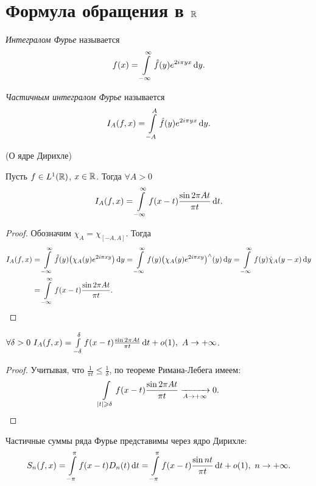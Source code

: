\section{Формула обращения в $\mathbb{R}$}

\begin{definition}
    \textit{Интегралом Фурье} называется
    \[
        f(x) = \int\limits_{-\infty}^\infty{\hat{f}(y) e^{2i\pi yx} \,\mathrm{d}y}
    .\]
\end{definition}

\begin{definition}
    \textit{Частичным интегралом Фурье} называется
    \[
        I_A(f, x) = \int\limits_{-A}^A{\hat{f}(y) e^{2i\pi yx} \,\mathrm{d} y}
    .\]
\end{definition}

\begin{lemma}(О ядре Дирихле)
   
    Пусть $f \in L^1(\mathbb{R})$, $x \in \mathbb{R}$. Тогда $\forall A > 0$
    \[
        I_A(f, x) = \int\limits_{-\infty}^\infty{f(x - t) \frac{\sin{2\pi At}}{\pi t} \,\mathrm{d}t} 
    .\]
\end{lemma}
\begin{proof}
    Обозначим $\chi_A = \chi_{[-A, A]}$. Тогда
    \begin{align*}
        I_A(f, x) 
        &= \intl_{-\infty}^\infty{\hat{f}(y) \parens*{\chi_A(y) e^{2i\pi xy}} \dd y}
        = \intl_{-\infty}^\infty{f(y) \parens*{\chi_A(y) e^{2i\pi xy}}^\wedge(y) \dd y}
        = \intl_{-\infty}^\infty{f(y) \hat{\chi}_A(y - x) \dd y} \\
        &= \intl_{-\infty}^\infty{f(x - t) \frac{\sin{2\pi At}}{\pi t}}
    .\end{align*}
\end{proof}

\begin{corollary}
    $\forall \delta > 0~ I_A(f, x) = \int\limits_{-\delta}^\delta{f(x - t)
    \frac{\sin{2\pi At}}{\pi t} \,\mathrm{d}t} + o(1),~ A \to +\infty$.
\end{corollary}
\begin{proof}
    Учитывая, что $\frac{1}{\pi t} \leqslant \frac{1}{\delta}$, по теореме 
    Римана-Лебега имеем:
    \[
        \int\limits_{|t| \geqslant \delta}{f(x - t) \frac{\sin{2\pi At}}{\pi t}}
        \xrightarrow[A \to +\infty]{} 0
    .\]
\end{proof}

\begin{remark}
    Частичные суммы ряда Фурье представимы через ядро Дирихле:
    \[
        S_n(f, x) = \int\limits_{-\pi}^\pi{f(x - t) D_n(t) \,\mathrm{d}t} =
        \int\limits_{-\pi}^\pi{f(x - t) \frac{\sin{nt}}{\pi t} \,\mathrm{d}t} + o(1),~ n \to +\infty
    .\]
\end{remark}

